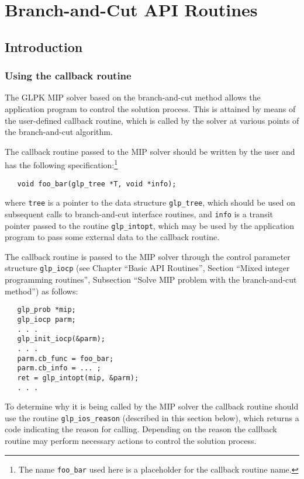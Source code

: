 
\chapter{Branch-and-Cut API Routines}

\section{Introduction}

\subsection{Using the callback routine}

The GLPK MIP solver based on the branch-and-cut method allows the
application program to control the solution process. This is attained
by means of the user-defined callback routine, which is called by the
solver at various points of the branch-and-cut algorithm.

The callback routine passed to the MIP solver should be written by the
user and has the following specification:\footnote{The name
{\tt foo\_bar} used here is a placeholder for the callback routine
name.}

\begin{verbatim}
   void foo_bar(glp_tree *T, void *info);
\end{verbatim}

\noindent
where \verb|tree| is a pointer to the data structure \verb|glp_tree|,
which should be used on subsequent calls to branch-and-cut interface
routines, and \verb|info| is a transit pointer passed to the routine
\verb|glp_intopt|, which may be used by the application program to pass
some external data to the callback routine.

The callback routine is passed to the MIP solver through the control
parameter structure \verb|glp_iocp| (see Chapter ``Basic API
Routines'', Section ``Mixed integer programming routines'', Subsection
``Solve MIP problem with the branch-and-cut method'') as follows:

\begin{verbatim}
   glp_prob *mip;
   glp_iocp parm;
   . . .
   glp_init_iocp(&parm);
   . . .
   parm.cb_func = foo_bar;
   parm.cb_info = ... ;
   ret = glp_intopt(mip, &parm);
   . . .
\end{verbatim}

To determine why it is being called by the MIP solver the callback
routine should use the routine \verb|glp_ios_reason| (described in this
section below), which returns a code indicating the reason for calling.
Depending on the reason the callback routine may perform necessary
actions to control the solution process.

